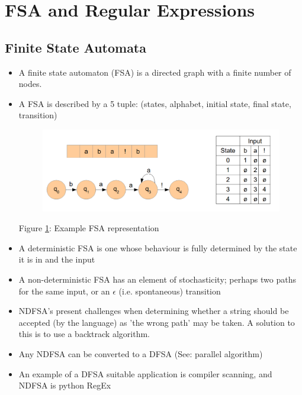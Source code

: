 \documentclass[]{article}
\begin{document}
\section{FSA and Regular Expressions}
\subsection{Finite State Automata}
\begin{itemize}
	\item A finite state automaton (FSA) is a directed graph with a finite number of nodes.

	\item A FSA is described by a 5 tuple: (states, alphabet, initial state, final state, transition)
	
	\begin{figure}[h!]
		\begin{center}
			\includegraphics[width=\linewidth]{./images/fsa1.png}
			\label{fig:fsa1}
			\end{center}
	\end{figure}
	
	\begin{center}
	Figure \ref{fig:fsa1}: Example FSA representation
	\end{center}
	

	\item A deterministic FSA is one whose behaviour is fully determined by the state it is in and the input
	

	\item A non-deterministic FSA has an element of stochasticity; perhaps two paths for the same input, or an $\epsilon$ (i.e. spontaneous) transition 
	
	\item NDFSA's present challenges when determining whether a string should be accepted (by the language) as 'the wrong path' may be taken. A solution to this is to use a backtrack algorithm.
	
	\item Any NDFSA can be converted to a DFSA (See: parallel algorithm)
	
	\item An example of a DFSA suitable application is compiler scanning, and NDFSA is python RegEx
	
	

\end{itemize}
\newpage
\end{document}
